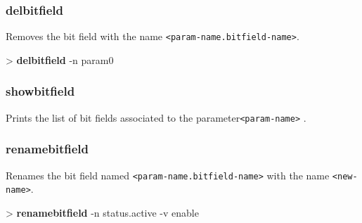 \documentclass[10pt,a4paper]{article}
\begin{document}
\subsubsection{delbitfield}
\label{subsec:delbitfield}

Removes the bit field with the name \texttt{<param-name.bitfield-name>}.\\


\begin{sampletitle}
> \textbf{\tool{} delbitfield} -n param0
\end{sampletitle}


\subsubsection{showbitfield}
\label{subsec:showbitfield}

Prints the list of bit fields associated to the parameter\texttt{<param-name>} .

\subsubsection{renamebitfield}
\label{subsec:renamebitfield}

Renames the bit field named \texttt{<param-name.bitfield-name>} with the name \texttt{<new-name>}.\\


\begin{sampletitle}
> \textbf{\tool{} renamebitfield} -n status.active -v enable
\end{sampletitle}
\end{document}
